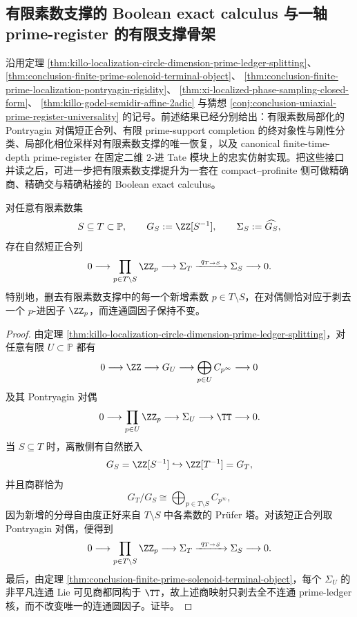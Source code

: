 \subsection{有限素数支撑的 Boolean exact calculus 与一轴 prime-register 的有限支撑骨架}\label{subsec:conclusion-finite-primesupport-boolean-exact-uniaxial-register}
沿用定理
\ref{thm:killo-localization-circle-dimension-prime-ledger-splitting}、
\ref{thm:conclusion-finite-prime-solenoid-terminal-object}、
\ref{thm:conclusion-finite-prime-localization-pontryagin-rigidity}、
\ref{thm:xi-localized-phase-sampling-closed-form}、
\ref{thm:killo-godel-semidir-affine-2adic}
与猜想
\ref{conj:conclusion-uniaxial-prime-register-universality}
的记号。前述结果已经分别给出：有限素数局部化的 Pontryagin 对偶短正合列、有限 prime-support completion 的终对象性与刚性分类、局部化相位采样对有限素数支撑的唯一恢复，以及 canonical finite-time-depth prime-register 在固定二维 \(2\)-进 Tate 模块上的忠实仿射实现。把这些接口并读之后，可进一步把有限素数支撑提升为一套在 compact--profinite 侧可做精确商、精确交与精确粘接的 Boolean exact calculus。

\begin{theorem}[有限素数支撑的精确商]\label{thm:conclusion-finite-primesupport-exact-quotient}
对任意有限素数集
\[
S\subseteq T\subset \mathbb P,
\qquad
G_S:=\ZZ[S^{-1}],
\qquad
\Sigma_S:=\widehat{G_S},
\]
存在自然短正合列
\[
0\longrightarrow \prod_{p\in T\setminus S}\ZZ_p
\longrightarrow \Sigma_T
\xrightarrow{\ q_{T\to S}\ }
\Sigma_S
\longrightarrow 0.
\]
特别地，删去有限素数支撑中的每一个新增素数 \(p\in T\setminus S\)，在对偶侧恰对应于剥去一个 \(p\)-进因子 \(\ZZ_p\)，而连通圆因子保持不变。
\end{theorem}
\begin{proof}
由定理 \ref{thm:killo-localization-circle-dimension-prime-ledger-splitting}，对任意有限 \(U\subset \mathbb P\) 都有
\[
0\longrightarrow \ZZ\longrightarrow G_U\longrightarrow \bigoplus_{p\in U}C_{p^\infty}\longrightarrow 0
\]
及其 Pontryagin 对偶
\[
0\longrightarrow \prod_{p\in U}\ZZ_p\longrightarrow \Sigma_U\longrightarrow \TT\longrightarrow 0.
\]
当 \(S\subseteq T\) 时，离散侧有自然嵌入
\[
G_S=\ZZ[S^{-1}]\hookrightarrow \ZZ[T^{-1}]=G_T,
\]
并且商群恰为
\[
G_T/G_S\cong \bigoplus_{p\in T\setminus S}C_{p^\infty},
\]
因为新增的分母自由度正好来自 \(T\setminus S\) 中各素数的 Prüfer 塔。对该短正合列取 Pontryagin 对偶，便得到
\[
0\longrightarrow \prod_{p\in T\setminus S}\ZZ_p
\longrightarrow \Sigma_T
\xrightarrow{\ q_{T\to S}\ }
\Sigma_S
\longrightarrow 0.
\]
最后，由定理 \ref{thm:conclusion-finite-prime-solenoid-terminal-object}，每个 \(\Sigma_U\) 的非平凡连通 Lie 可见商都同构于 \(\TT\)，故上述商映射只剥去全不连通 prime-ledger 核，而不改变唯一的连通圆因子。证毕。
\end{proof}

